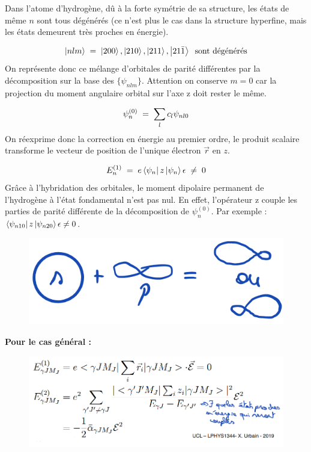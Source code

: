 Dans l'atome d'hydrogène, dû à la forte symétrie de sa structure, les états de même $n$ sont tous dégénérés (ce n'est plus le cas dans la structure hyperfine, mais les états demeurent très proches en énergie).

\[
    \ket{nlm}\; = \; \ket{200},\ket{210},\ket{211},\ket{21\bar{1}}\;\;\text{sont dégénérés}
\]
On représente donc ce mélange d'orbitales de parité différentes par la décomposition sur la base des $\{\psi_{nlm}\}$. Attention on conserve $m = 0$ car la projection du moment angulaire orbital sur l'axe z doit rester le même. %

\[
    \psi_n^{(0)} \; = \; \sum_l c_l \psi_{nl0}
\]
On réexprime donc la correction en énergie au premier ordre, le produit scalaire transforme le vecteur de position de l'unique électron $\vec{r}$ en $z$.

\[
    E_n^{(1)} \; = \; e\bra{\psi_n}z\ket{\psi_n}\epsilon \;\neq \; 0
\]
Grâce à l'hybridation des orbitales, le moment dipolaire permanent de l'hydrogène à l'état fondamental n'est pas nul. En effet, l'opérateur z couple les parties de parité différente de la décomposition de $\psi_n^{(0)}$. Par exemple : $\bra{\psi_{n10}}z\ket{\psi_{n20}}\epsilon \neq 0$.\\

\begin{figure}[htp]
    \centering
    \includegraphics[scale=0.5]{Images2/hybridation.png}
\end{figure}

\textbf{Pour le cas général :}\\

\begin{figure}[htp]
    \centering
    \includegraphics[scale=0.8]{Images2/correcordre.PNG}
\end{figure}

